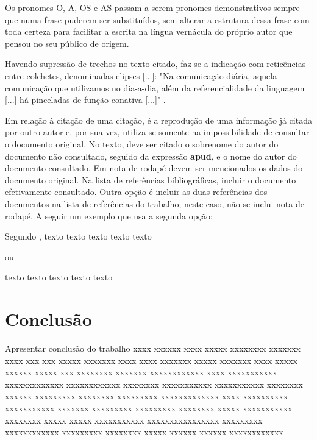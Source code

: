 \documentclass[
	oneside,
	english,brazil,
	mestrado,ppgc]{infufrgs}
\begin{document}
\begin{citacao}
    Os pronomes O, A, OS e AS passam a serem pronomes demonstrativos sempre que
    numa frase puderem ser substituídos, sem alterar a estrutura dessa frase
    com toda certeza para facilitar a escrita na língua vernácula do próprio
    autor que pensou no seu público de origem. \cite[p.~19]{simoes}
\end{citacao}

Havendo supressão de trechos no texto citado, faz-se a indicação com
reticências entre colchetes, denominadas elipses [...]: "Na comunicação diária,
aquela comunicação que utilizamos no dia-a-dia, além da referencialidade da
linguagem [...] há pinceladas de função conativa [...]" \cite[p.~37]{chalhub}.

Em relação à citação de uma citação, é a reprodução de uma informação já citada
por outro autor e, por sua vez, utiliza-se somente na impossibilidade de
consultar o documento original. No texto, deve ser citado o sobrenome do autor
do documento não consultado, seguido da expressão \textbf{apud}, e o nome do
autor do documento consultado. Em nota de rodapé devem ser mencionados os dados
do documento original. Na lista de referências bibliográficas, incluir o
documento efetivamente consultado. Outra opção é incluir as duas referências
dos documentos na lista de referências do trabalho; neste caso, não se inclui
nota de rodapé. A seguir um exemplo que usa a segunda opção:

\begin{framed}
    Segundo , texto texto texto texto texto
\end{framed}

ou

\begin{framed}
    texto texto texto texto texto 
\end{framed}

\chapter{Conclusão}
Apresentar
conclusão
do
trabalho
xxxx xxxxxx xxxx xxxxx xxxxxxxx xxxxxxx xxxx xxx xxx xxxxx xxxxxxx xxxx xxxx
xxxxxxx xxxxx xxxxxxx xxxx xxxxx xxxxxx xxxxx xxx xxxxxxxx xxxxxxx xxxxxxxxxxxx
xxxx xxxxxxxxxxx xxxxxxxxxxxxx xxxxxxxxxxxx xxxxxxxx xxxxxxxxxxx xxxxxxxxxxx
xxxxxxxx xxxxxx xxxxxxxxx xxxxxxxx xxxxxxxxx xxxxxxxxxxxxx xxxx xxxxxxxxxx
xxxxxxxxxxx xxxxxxx xxxxxxxxx xxxxxxxxx xxxxxxxx xxxxx xxxxxxxxxxx xxxxxxxx
xxxxx xxxxx xxxxxxxxxxx xxxxxxxxxxxxxxxx xxxxxxxxx xxxxxxxxxxxx xxxxxxxxx
xxxxxxxx xxxxx xxxxxx xxxxxx xxxxxxxxxxxx
\end{document}
